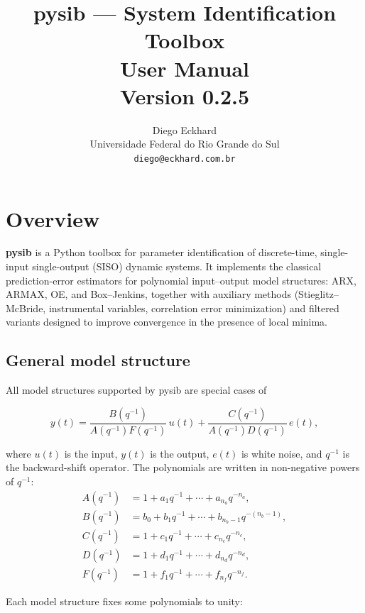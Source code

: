 \documentclass[11pt,a4paper]{article}
\title{\textbf{pysib} --- System Identification Toolbox\\[0.5em]
       \large User Manual\\[0.5em]
       \normalsize Version 0.2.5}
\author{Diego Eckhard\\
        Universidade Federal do Rio Grande do Sul\\
        \texttt{diego@eckhard.com.br}}
\date{}
\begin{document}
\maketitle
\tableofcontents
\newpage

\section{Overview}

\textbf{pysib} is a Python toolbox for parameter identification of
discrete-time, single-input single-output (SISO) dynamic systems.
It implements the classical prediction-error estimators for polynomial
input--output model structures: ARX, ARMAX, OE, and Box--Jenkins,
together with auxiliary methods (Stieglitz--McBride, instrumental
variables, correlation error minimization) and filtered variants
designed to improve convergence in the presence of local minima.

\subsection{General model structure}

All model structures supported by pysib are special cases of

\begin{equation}
  y(t) =
  \frac{B(q^{-1})}{A(q^{-1})F(q^{-1})}\,u(t)
  + \frac{C(q^{-1})}{A(q^{-1})D(q^{-1})}\,e(t),
  \label{eq:general}
\end{equation}

where $u(t)$ is the input, $y(t)$ is the output, $e(t)$ is white
noise, and $q^{-1}$ is the backward-shift operator.
The polynomials are written in non-negative powers of $q^{-1}$:
\begin{align*}
  A(q^{-1}) &= 1 + a_1 q^{-1} + \cdots + a_{n_a} q^{-n_a}, \\
  B(q^{-1}) &= b_0 + b_1 q^{-1} + \cdots + b_{n_b-1} q^{-(n_b-1)}, \\
  C(q^{-1}) &= 1 + c_1 q^{-1} + \cdots + c_{n_c} q^{-n_c}, \\
  D(q^{-1}) &= 1 + d_1 q^{-1} + \cdots + d_{n_d} q^{-n_d}, \\
  F(q^{-1}) &= 1 + f_1 q^{-1} + \cdots + f_{n_f} q^{-n_f}.
\end{align*}

Each model structure fixes some polynomials to unity:
\end{document}
